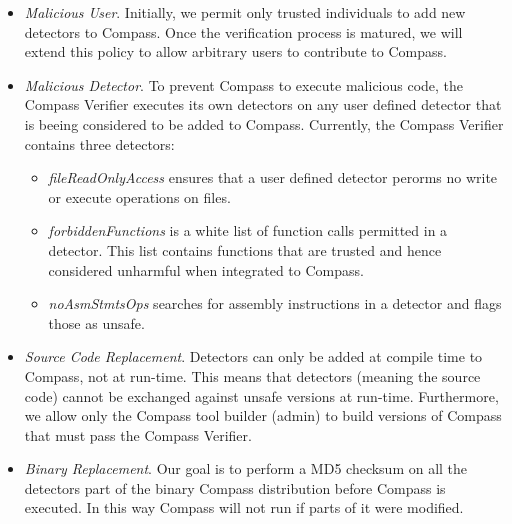 \begin{itemize}
\item \emph{Malicious User}. Initially, we permit only trusted individuals to add new detectors to Compass. Once the verification process
  is matured, we will extend this policy to allow arbitrary users to contribute to Compass. 

\item \emph{Malicious Detector}. To prevent Compass to execute malicious code, the Compass Verifier executes its own detectors on
any user defined detector that is beeing considered to be added to Compass.
Currently, the Compass Verifier contains three detectors:

\begin{itemize}
\item \emph{fileReadOnlyAccess} ensures that a user defined detector perorms no write or execute operations on files. 
\item \emph{forbiddenFunctions} is a white list of function calls permitted in a detector. This list contains functions
that are trusted and hence considered unharmful when integrated to Compass.
\item \emph{noAsmStmtsOps} searches for assembly instructions in a detector and flags those as unsafe.
\end{itemize}

\item \emph{Source Code Replacement}. Detectors can only be added at compile time to Compass, not at run-time.
This means that detectors (meaning the source code) cannot be exchanged against unsafe versions at run-time. Furthermore, we allow only 
the Compass tool builder (admin) to build versions of Compass that must pass the Compass Verifier.

\item \emph{Binary Replacement}. Our goal is to perform a MD5 checksum on all the detectors part of the binary Compass distribution before
  Compass is executed. In this way Compass will not run if parts of it were modified.
\end{itemize} 




